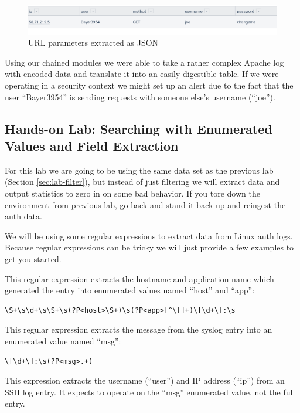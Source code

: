 \begin{figure}
	\includegraphics[width=0.8\linewidth]{images/url-extract-json.png}
	\caption{URL parameters extracted as JSON}
	\label{fig:url-extract-json}
\end{figure}

Using our chained modules we were able to take a rather complex Apache
log with encoded data and translate it into an easily-digestible table.
If we were operating in a security context we might set up an alert due
to the fact that the user ``Bayer3954'' is sending requests with someone
else's username (``joe'').

\clearpage
\subsection{Hands-on Lab: Searching with Enumerated Values and Field Extraction}

For this lab we are going to be using the same data set as the previous lab (Section \ref{sec:lab-filter}), but
instead of just filtering we will extract data and output statistics to
zero in on some bad behavior. If you tore down the environment from
previous lab, go back and stand it back up and reingest the auth data.

We will be using some regular expressions to extract data from Linux
auth logs. Because regular expressions can be tricky we will just
provide a few examples to get you started.

This regular expression extracts the hostname and application name which generated the entry into enumerated values named ``host'' and ``app'':

\begin{Verbatim}[breaklines=true]
\S+\s\d+\s\S+\s(?P<host>\S+)\s(?P<app>[^\[]+)\[\d+\]:\s
\end{Verbatim}

This regular expression extracts the message from the syslog entry into an enumerated value named ``msg'':

\begin{Verbatim}[breaklines=true]
\[\d+\]:\s(?P<msg>.+)
\end{Verbatim}

This expression extracts the username (``user'') and IP address (``ip'') from an SSH log entry. It expects to operate on the ``msg'' enumerated value, not the full entry.

